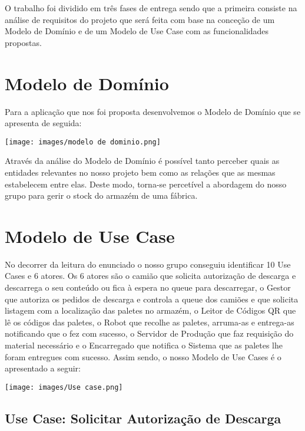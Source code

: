 \documentclass[11pt]{article}
\begin{document}
O trabalho foi dividido em três fases de entrega sendo que a primeira consiste na análise de requisitos do projeto que será feita com base na conceção de um Modelo de Domínio e de um Modelo de Use Case com as funcionalidades propostas.

\section{Modelo de Domínio}

Para a aplicação que nos foi proposta desenvolvemos o Modelo de Domínio que se apresenta de seguida:

\begin{center}
    \texttt{[image: images/modelo de dominio.png]}
\end{center}

Através da análise do Modelo de Domínio é possível tanto perceber quais as entidades relevantes no nosso projeto bem como as relações que as mesmas estabelecem entre elas. Deste modo, torna-se percetível a abordagem do nosso grupo para gerir o stock do armazém de uma fábrica. 

\section{Modelo de Use Case}

No decorrer da leitura do enunciado o nosso grupo conseguiu identificar 10 Use Cases e 6 atores. Os 6 atores são o camião que solicita autorização de descarga e descarrega o seu conteúdo ou fica à espera no queue para descarregar, o Gestor que autoriza os pedidos de descarga e controla a queue dos camiões e que solicita listagem com a localização das paletes no armazém, o Leitor de Códigos QR que lê os códigos das paletes, o Robot que recolhe as paletes, arruma-as e entrega-as notificando que o fez com sucesso, o Servidor de Produção que faz requisição do material necessário e o Encarregado que notifica o Sistema que as paletes lhe foram entregues com sucesso. Assim sendo, o nosso Modelo de Use Cases é o apresentado a seguir:

\begin{center}
    \texttt{[image: images/Use case.png]}
\end{center}

\subsection{Use Case: Solicitar Autorização de Descarga}
\end{document}
